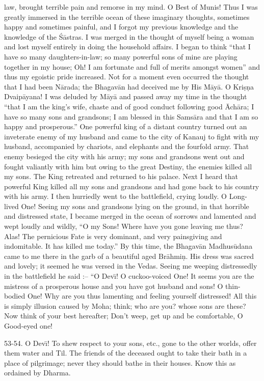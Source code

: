 law, brought terrible pain and remorse in my mind. O Best of Munis! Thus I was greatly immersed in the terrible ocean of these imaginary thoughts, sometimes happy and sometimes painful, and I forgot my previous knowledge and the knowledge of the \'S\=astras. I was merged in the thought of myself being a woman and lost myself entirely in doing the household affairs. I began to think ``that I have so many daughters-in-law; so many powerful sons of mine are playing together in my house; Oh! I am fortunate and full of merits amongst women'' and thus my egoistic pride increased. Not for a moment even occurred the thought that I had been N\=arada; the Bhagav\=an had deceived me by His M\=ay\=a. O Kri\d{s}\d{n}a Dvaip\=ayana! I was deluded by M\=ay\=a and passed away my time in the thought ``that I am the king's wife, chaste and of good conduct following good \=Ach\=ara; I have so many sons and grandsons; I am blessed in this Sams\=ara and that I am so happy and prosperous.'' One powerful king of a distant country turned out an inveterate enemy of my husband and came to the city of Kanauj to fight with my husband, accompanied by chariots, and elephants and the fourfold army. That enemy besieged the city with his army; my sons and grandsons went out and fought valiantly with him but owing to the great Destiny, the enemies killed all my sons. The King retreated and returned to his palace. Next I heard that powerful King killed all my sons and grandsons and had gone back to his country with his army. I then hurriedly went to the battlefield, crying loudly. O Long-lived One! Seeing my sons and grandsons lying on the ground, in that horrible and distressed state, I became merged in the ocean of sorrows and lamented and wept loudly and wildly, ``O my Sons! Where have you gone leaving me thus? Alas! The pernicious Fate is very dominant, and very painsgiving and indomitable. It has killed me today.'' By this time, the Bhagav\=an Madhus\=udana came to me there in the garb of a beautiful aged Br\=ahmi\d{n}. His dress was sacred and lovely; it seemed he was versed in the Vedas. Seeing me weeping distressedly in the battlefield he said :-- ``O Dev\={\i}! O cuckoo-voiced One! It seems you are the mistress of a prosperous house and you have got husband and sons! O thin-bodied One! Why are you thus lamenting and feeling yourself distressed! All this is simply illusion caused by Moha; think; who are you? whose sons are these? Now think of your best hereafter; Don't weep, get up and be comfortable, O Good-eyed one!

53-54. O Dev\={\i}! To shew respect to your sons, etc., gone to the other worlds, offer them water and Til. The friends of the deceased ought to take their bath in a place of pilgrimage; never they should bathe in their houses. Know this as ordained by Dharma.

